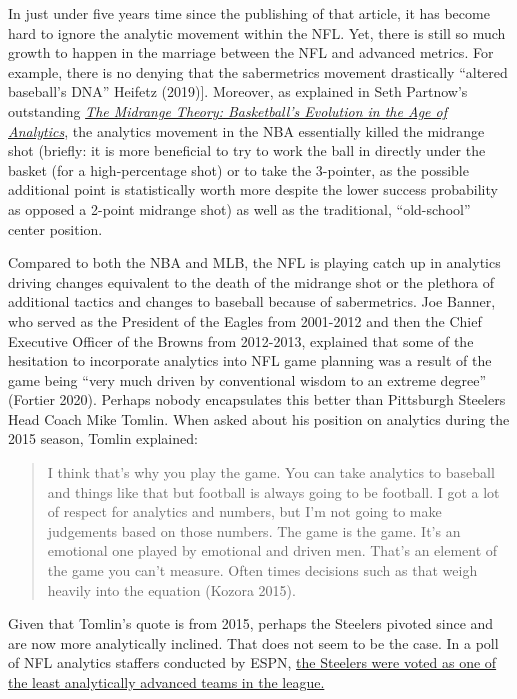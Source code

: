 \documentclass[
  letterpaper,
]{krantz}
\begin{document}
In just under five years time since the publishing of that article, it
has become hard to ignore the analytic movement within the NFL. Yet,
there is still so much growth to happen in the marriage between the NFL
and advanced metrics. For example, there is no denying that the
sabermetrics movement drastically ``altered baseball's DNA'' Heifetz
(2019){]}. Moreover, as explained in Seth Partnow's outstanding
\href{https://www.amazon.com/Midrange-Theory-Basketballs-Evolution-Analytics/dp/1637270968/ref=tmm_pap_swatch_0?_encoding=UTF8\&qid=1656245879\&sr=8-4}{\emph{The
Midrange Theory: Basketball's Evolution in the Age of Analytics}}, the
analytics movement in the NBA essentially killed the midrange shot
(briefly: it is more beneficial to try to work the ball in directly
under the basket (for a high-percentage shot) or to take the 3-pointer,
as the possible additional point is statistically worth more despite the
lower success probability as opposed a 2-point midrange shot) as well as
the traditional, ``old-school'' center position.

Compared to both the NBA and MLB, the NFL is playing catch up in
analytics driving changes equivalent to the death of the midrange shot
or the plethora of additional tactics and changes to baseball because of
sabermetrics. Joe Banner, who served as the President of the Eagles from
2001-2012 and then the Chief Executive Officer of the Browns from
2012-2013, explained that some of the hesitation to incorporate
analytics into NFL game planning was a result of the game being ``very
much driven by conventional wisdom to an extreme degree'' (Fortier
2020). Perhaps nobody encapsulates this better than Pittsburgh Steelers
Head Coach Mike Tomlin. When asked about his position on analytics
during the 2015 season, Tomlin explained:

\begin{quote}
I think that's why you play the game. You can take analytics to baseball
and things like that but football is always going to be football. I got
a lot of respect for analytics and numbers, but I'm not going to make
judgements based on those numbers. The game is the game. It's an
emotional one played by emotional and driven men. That's an element of
the game you can't measure. Often times decisions such as that weigh
heavily into the equation (Kozora 2015).
\end{quote}

Given that Tomlin's quote is from 2015, perhaps the Steelers pivoted
since and are now more analytically inclined. That does not seem to be
the case. In a poll of NFL analytics staffers conducted by ESPN,
\href{https://www.espn.com/nfl/story/_/id/29939438/2020-nfl-analytics-survey-which-teams-most-least-analytically-inclined\#least}{the
Steelers were voted as one of the least analytically advanced teams in
the league.}
\end{document}
